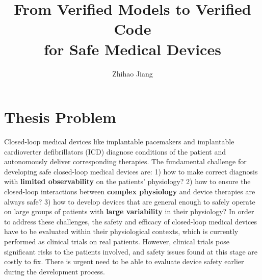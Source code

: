 \documentclass[a4paper,11pt]{article}
\title{From Verified Models to Verified Code\\ for Safe Medical Devices}
\author{Zhihao Jiang}
\begin{document}
\maketitle


\section*{Thesis Problem}
Closed-loop medical devices like implantable pacemakers and implantable cardioverter defibrillators (ICD) diagnose conditions of the patient and autonomously deliver corresponding therapies.
The fundamental challenge for developing safe closed-loop medical devices are: 
1) how to make correct diagnosis with \textbf{limited observability} on the patients' physiology? 
2) how to ensure the closed-loop interactions between \textbf{complex physiology} and device therapies are always safe?
3) how to develop devices that are general enough to safely operate on large groups of patients with \textbf{large variability} in their physiology?
In order to address these challenges, the safety and efficacy of closed-loop medical devices have to be evaluated within their physiological contexts, which is currently performed as clinical trials on real patients.
However, clinical trials pose significant risks to the patients involved, and safety issues found at this stage are costly to fix. 
There is urgent need to be able to evaluate device safety earlier during the development process.
\end{document}
